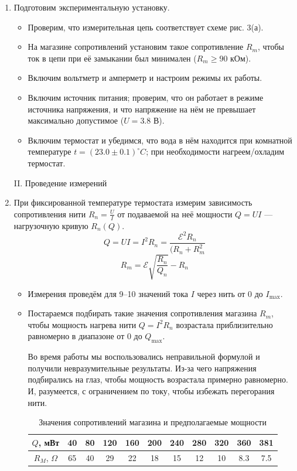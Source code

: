 \documentclass[a4paper,12pt]{article} %
\begin{document}
\begin{enumerate}
\item Подготовим экспериментальную установку.
\begin{itemize}
  \item Проверим, что измерительная цепь соответствует схеме рис. 3(а).
  \item На магазине сопротивлений установим такое сопротивление $R_m$, чтобы ток в цепи при её замыкании был минимален ($R_m \geqslant 90$ кОм).
  \item Включим вольтметр и амперметр и настроим режимы их работы.
  \item Включим источник питания; проверим, что он работает в режиме источника напряжения, и что напряжение на нём не превышает максимально допустимое ($U = 3.8$ В).
  \item Включим термостат и убедимся, что вода в нём находится при комнатной температуре $t = (23.0 \pm 0.1) ^\circ C$; при необходимости нагреем/охладим термостат.
\end{itemize}

\begin{center}
  \textsf{II. Проведение измерений}
\end{center}

    \item При фиксированной температуре термостата измерим зависимость сопротивления нити $R_n = \frac{U}{I}$ от подаваемой на неё мощности $Q = U I$ — нагрузочную кривую $R_n(Q)$.
    \[
      Q = UI = I^2 R_n = \frac{\mathcal{E}^2 R_n}{(R_n + R_m^2} 
    \]
    \[
      R_m = \mathcal{E} \sqrt{\frac{R_n}{Q_n}} - R_n
    \]

    \begin{itemize}
      \item Измерения проведём для 9–10 значений тока $I$ через нить от 0 до $I_{\text{max}}$.
      
      \item Постараемся подбирать такие значения сопротивления магазина $R_m$, чтобы мощность нагрева нити $Q = I^2 R_n$ возрастала приблизительно равномерно в диапазоне от 0 до $Q_{\text{max}}$.
      
      Во время работы мы воспользовались неправильной формулой и получили невразумительные результаты. Из-за чего напряжения подбирались на глаз, чтобы мощность возрастала примерно равномерно. И, разумеется, с ограничением по току, чтобы избежать перегорания нити.

      \begin{table}[h!]
        \centering
        \begin{tabular}{|c|cccccccccc|}
          \hline
          $Q$, мВт & 40 & 80 & 120 & 160 & 200 & 240 & 280 & 320 & 360 & 381 \\
          \hline
          $R_M$, $\Omega$ & 65 & 40 & 29 & 22 & 18 & 15 & 12 & 10 & 8.3 & 7.5 \\
          \hline
          \end{tabular}
        \label{tab:QRm}
        \caption{Значения сопротивлений магазина и предполагаемые мощности}
      \end{table}
    

\end{itemize}
\end{enumerate}
\end{document}
